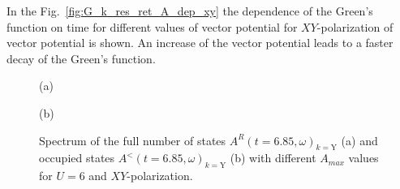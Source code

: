 In the Fig.~\ref{fig:G_k_res_ret_A_dep_xy} the dependence of the Green's function on time for different values of vector potential for $XY$-polarization of vector potential is shown. An increase of the vector potential leads to a faster decay of the Green's function. 
\begin{figure}[ht]
\begin{minipage}[h]{0.5\linewidth}
 (a) \\
\end{minipage}
\hfill
\begin{minipage}[h]{0.5\linewidth}
 (b) \\
\end{minipage}
\caption{Spectrum of the full number of states $A^{R}(t=6.85,\omega)_{k=\text{Y}}$ (a) and occupied states $A^{<}(t=6.85,\omega)_{k=\text{Y}}$ (b) with different $A_{max}$ values for $U=6$ and $XY$-polarization.}
\label{fig:G_k_res_ret_A_dep_w_xy}
\end{figure}

